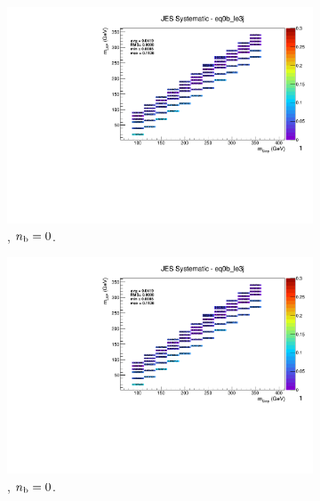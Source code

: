 \begin{figure}[ht!]
  \centering
  \begin{subfigure}[b]{0.32\textwidth}
    \includegraphics[width=\textwidth, page=12]{Figs/sms/t2cc/v37_2/systs/T2cc_JES_eq0b_le3j.pdf}
    \caption{\njlow, $n_{\text{b}} = 0$.}
  \end{subfigure}
  \begin{subfigure}[b]{0.32\textwidth}
    \includegraphics[width=\textwidth, page=8]{Figs/sms/t2cc/v37_2/systs/T2cc_JES_eq0b_le3j.pdf}
    \caption{\njlow, $n_{\text{b}} = 0$.}
  \end{subfigure}
  \begin{subfigure}[b]{0.32\textwidth}

\end{subfigure}
\end{figure}
